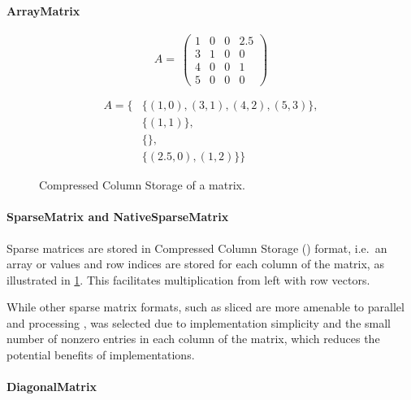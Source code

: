 \paragraph{ArrayMatrix}

\begin{figure}
  \centering
  \begin{minipage}{0.5\linewidth}
    \begin{equation}
      A = \
      \begin{pmatrix}
        1 & 0 & 0 & 2.5 \\
        3 & 1 & 0 & 0 \\
        4 & 0 & 0 & 1 \\
        5 & 0 & 0 & 0
      \end{pmatrix}
    \end{equation}
  \end{minipage}%
  \begin{minipage}{0.5\linewidth}
    \begin{align}
      A = \{&\{(1,0), (3,1), (4,2), (5,3)\}, \\
      &\{(1,1)\}, \\
      &\{\}, \\
      &\{(2.5,0), (1,2)\}\}
    \end{align}
  \end{minipage}
  \caption{Compressed Column Storage of a matrix.}
  \label{fig:genstor:matrix:ccs}
\end{figure}

\paragraph{SparseMatrix and NativeSparseMatrix}

Sparse matrices are stored in Compressed Column Storage ()
format, i.e.~an array or values and row indices are stored for each
column of the matrix, as illustrated in
\cref{fig:genstor:matrix:ccs}. This facilitates multiplication from
left with row vectors.

While other sparse matrix formats, such as sliced  are
more amenable to parallel and \textls{SIMD} processing
\citet{DBLP:journals/corr/KreutzerHWFB13},  was selected
due to implementation simplicity and the small number of nonzero
entries in each column of the matrix, which reduces the potential
benefits of \textls{SIMD} implementations.

\paragraph{DiagonalMatrix}

